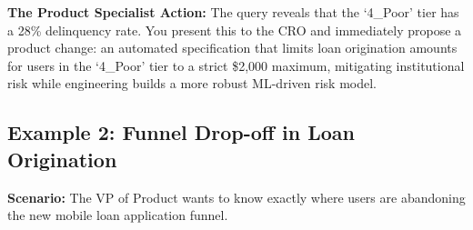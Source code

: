 \textbf{The Product Specialist Action:} The query reveals that the
`4\_Poor' tier has a 28\% delinquency rate. You present this to the CRO
and immediately propose a product change: an automated specification
that limits loan origination amounts for users in the `4\_Poor' tier to
a strict \$2,000 maximum, mitigating institutional risk while
engineering builds a more robust ML-driven risk model.

\subsection{Example 2: Funnel Drop-off in Loan
Origination}\label{example-2-funnel-drop-off-in-loan-origination}

\textbf{Scenario:} The VP of Product wants to know exactly where users
are abandoning the new mobile loan application funnel.

